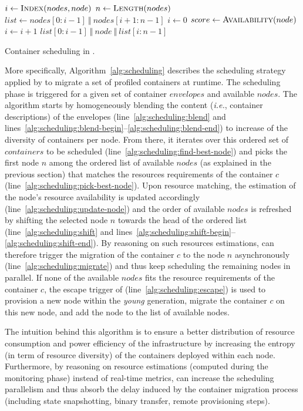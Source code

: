 \begin{algorithm}[ht!]
\begin{algorithmic}[1]
    \EndFunction\label{alg:scheduling:blend-end}
    \vspace{5pt}
    \label{alg:scheduling:shift-begin}
        \State $i \gets \Call{Index}{nodes, node}$
        \State $n \gets \Call{Length}{nodes}$
        \State $list \gets nodes[0:i-1]~\Vert~nodes[i+1:n-1]$
        \State $i \gets 0$
        \State $score \gets \Call{Availability}{node}$
            \State $i \gets i+1$
        \EndWhile
        \State \Return $list[0:i-1]~\Vert~node~\Vert~list[i:n-1]$
    \EndFunction\label{alg:scheduling:shift-end}
  \end{algorithmic}
  \caption{Container scheduling in \GP{}.}\label{alg:scheduling}
\end{algorithm}

More specifically, Algorithm~\ref{alg:scheduling} describes the scheduling strategy applied by \GP{} to migrate a set of profiled containers at runtime.
The scheduling phase is triggered for a given set of container $envelopes$ and available $nodes$.
The algorithm starts by homogeneously blending the content (\emph{i.e.}, container descriptions) of the envelopes (line~\ref{alg:scheduling:blend} and lines~\ref{alg:scheduling:blend-begin}--\ref{alg:scheduling:blend-end}) to increase of the diversity of containers per node.
From there, it iterates over this ordered set of $containers$ to be scheduled (line~\ref{alg:scheduling:find-best-node}) and picks the first node $n$ among the ordered list of available $nodes$ (as explained in the previous section) that matches the resources requirements of the container $c$ (line~\ref{alg:scheduling:pick-best-node}).
Upon resource matching, the estimation of the node's resource availability is updated accordingly (line~\ref{alg:scheduling:update-node}) and the order of available $nodes$ is refreshed by shifting the selected node $n$ towards the head of the ordered list (line~\ref{alg:scheduling:shift} and lines~\ref{alg:scheduling:shift-begin}--\ref{alg:scheduling:shift-end}).
By reasoning on such resources estimations, \GP{} can therefore trigger the migration of the container $c$ to the node $n$ asynchronously (line~\ref{alg:scheduling:migrate}) and thus keep scheduling the remaining nodes in parallel.
If none of the available $nodes$ fits the resource requirements of the container $c$, the escape trigger of \GP{} (line~\ref{alg:scheduling:escape}) is used to provision a new node within the \emph{young} generation, migrate the container $c$ on this new node, and add the node to the list of available nodes.

The intuition behind this algorithm is to ensure a better distribution of resource consumption and power efficiency of the infrastructure by increasing the entropy (in term of resource diversity) of the containers deployed within each node.
Furthermore, by reasoning on resource estimations (computed during the monitoring phase) instead of real-time metrics, \GP{} can increase the scheduling parallelism and thus absorb the delay induced by the container migration process (including state snapshotting, binary transfer, remote provisioning steps).
